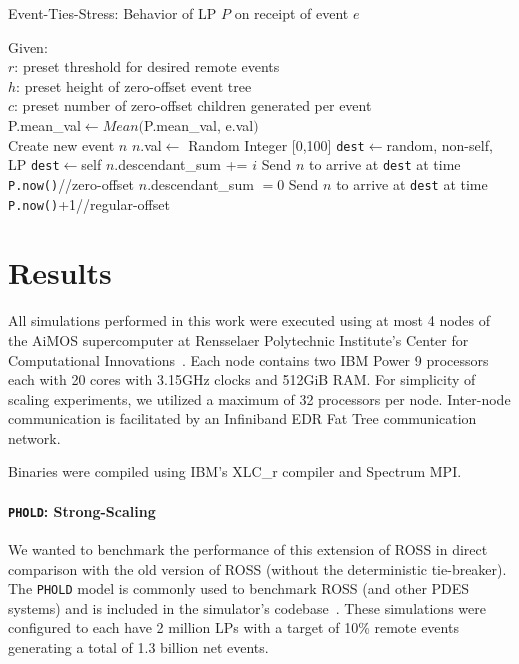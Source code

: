 \documentclass[nonacm,sigconf]{acmart}
\begin{document}
\begin{algorithm}[t]
  \caption{Event-Ties-Stress: Behavior of LP $P$ on receipt of event $e$}\label{alg:behavior2}
  \begin{algorithmic}
    \State Given:\\\hspace{.5cm}$r$: preset threshold for desired remote events\\\hspace{.5cm}$h$: preset height of zero-offset event tree\\\hspace{.5cm}$c$: preset number of zero-offset children generated per event\\
    \hrulefill
    \State P.mean\_val$\leftarrow Mean($P.mean\_val, e.val$)$
    \\
    
    \For{$i = [0:c)$}
      \State Create new event $n$
      \State $n$.val$\leftarrow$ Random Integer [0,100]
        \State \texttt{dest}$\leftarrow$random, non-self, LP 
      \Else
        \State \texttt{dest}$\leftarrow$self
      \EndIf
        \State$n$.descendant\_sum += $i$
        \State Send $n$ to arrive at \texttt{dest} at time \texttt{P.now()}\hfill //zero-offset
    \EndFor
      \State$n$.descendant\_sum $= 0$
      \State Send $n$ to arrive at \texttt{dest} at time \texttt{P.now()}+1\hfill //regular-offset
    \EndIf
    \end{algorithmic}
\end{algorithm}


\section{Results}
All simulations performed in this work were executed using at most 4 nodes of the AiMOS supercomputer at Rensselaer Polytechnic Institute's Center for Computational Innovations~\cite{cci}. Each node contains two IBM Power 9 processors each with 20 cores with 3.15GHz clocks and 512GiB RAM. For simplicity of scaling experiments, we utilized a maximum of 32 processors per node. Inter-node communication is facilitated by an Infiniband EDR Fat Tree communication network.

Binaries were compiled using IBM's XLC\_r compiler and Spectrum MPI.

\paragraph{\texttt{PHOLD}: Strong-Scaling}\label{sec:phold-scaling}
We wanted to benchmark the performance of this extension of ROSS in direct comparison with the old version of ROSS (without the deterministic tie-breaker). The \texttt{PHOLD} model is commonly used to benchmark ROSS (and other PDES systems) and is included in the simulator's codebase~\cite{barnes2013,fujimoto1990performance}. 
These simulations were configured to each have 2 million LPs with a target of 10\% remote events generating a total of 1.3 billion net events.
\end{document}
